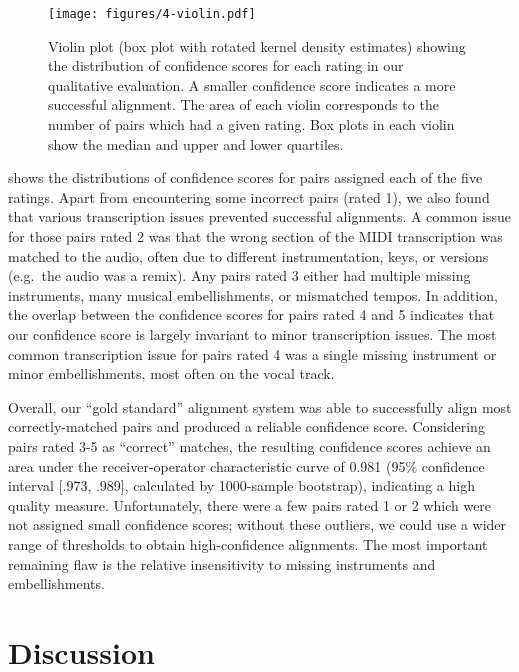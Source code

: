 \begin{figure}[t]
  \centering
  \texttt{[image: figures/4-violin.pdf]}
  \caption[Distributions of confidence scores for each rating]{Violin plot (box plot with rotated kernel density estimates) showing the distribution of confidence scores for each rating in our qualitative evaluation.
A smaller confidence score indicates a more successful alignment.
The area of each violin corresponds to the number of pairs which had a given rating.
Box plots in each violin show the median and upper and lower quartiles.}
  \label{fig:violin}
\end{figure}

 shows the distributions of confidence scores for pairs assigned each of the five ratings.
Apart from encountering some incorrect pairs (rated 1), we also found that various transcription issues prevented successful alignments.
A common issue for those pairs rated 2 was that the wrong section of the MIDI transcription was  matched to the audio, often due to different instrumentation, keys, or versions (e.g.\ the audio was a remix).
Any pairs rated 3 either had multiple missing instruments, many musical embellishments, or mismatched tempos.
In addition, the overlap between the confidence scores for pairs rated 4 and 5 indicates that our confidence score is largely invariant to minor transcription issues.
The most common transcription issue for pairs rated 4 was a single missing instrument or minor embellishments, most often on the vocal track.

Overall, our ``gold standard'' alignment system was able to successfully align most correctly-matched pairs and produced a reliable confidence score.
Considering pairs rated 3-5 as ``correct'' matches, the resulting confidence scores achieve an area under the receiver-operator characteristic curve of 0.981 (95\% confidence interval [.973, .989], calculated by 1000-sample bootstrap), indicating a high quality measure.
Unfortunately, there were a few pairs rated 1 or 2 which were not assigned small confidence scores; without these outliers, we could use a wider range of thresholds to obtain high-confidence alignments.
The most important remaining flaw is the relative insensitivity to missing instruments and embellishments.

\section{Discussion}
\label{sec:discussion}

